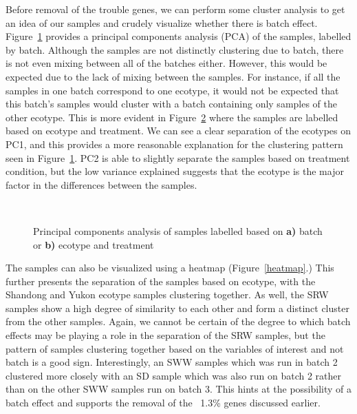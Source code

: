 \documentclass[12pt]{article}
\begin{document}
	Before removal of the trouble genes, we can perform some cluster analysis to get an idea of our samples and crudely visualize whether there is batch effect. Figure~\ref{pca_batch} provides a principal components analysis (PCA) of the samples, labelled by batch. Although the samples are not distinctly clustering due to batch, there is not even mixing between all of the batches either. However, this would be expected due to the lack of mixing between the samples. For instance, if all the samples in one batch correspond to one ecotype, it would not be expected that this batch's samples would cluster with a batch containing only samples of the other ecotype. This is more evident in Figure~\ref{pca_data} where the samples are labelled based on ecotype and treatment. We can see a clear separation of the ecotypes on PC1, and this provides a more reasonable explanation for the clustering pattern seen in Figure~\ref{pca_batch}. PC2 is able to slightly separate the samples based on treatment condition, but the low variance explained suggests that the ecotype is the major factor in the differences between the samples. 


\begin{figure}
	\centering
	\begin{subfigure}[b]{1\textwidth}
		\centering
			\scalebox{0.5}{}
		\caption{}
		\label{pca_batch}
	\end{subfigure}
	~ %
	\begin{subfigure}[b]{1\textwidth}
		\centering
			\scalebox{0.5}{}
		\caption{}
		\label{pca_data}
	\end{subfigure}
	\caption[Cluster analysis with PCA]{Principal components analysis of samples labelled based on \textbf{a)} batch or \textbf{b)} ecotype and treatment}
	\label{pca}
\end{figure}
		
	The samples can also be visualized using a heatmap (Figure~\ref{heatmap}.)	This further presents the separation of the samples based on ecotype, with the Shandong and Yukon ecotype samples clustering together. As well, the SRW samples show a high degree of similarity to each other and form a distinct cluster from the other samples. Again, we cannot be certain of the degree to which batch effects may be playing a role in the separation of the SRW samples, but the pattern of samples clustering together based on the variables of interest and not batch is a good sign. Interestingly, an SWW samples which was run in batch 2 clustered more closely with an SD sample which was also run on batch 2 rather than on the other SWW samples run on batch 3. This hints at the possibility of a batch effect and supports the removal of the ~1.3\% genes discussed earlier.
		
\end{document}
